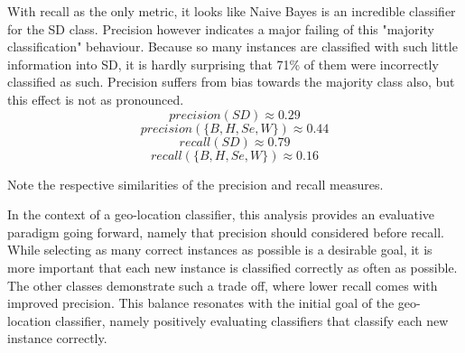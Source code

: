 \documentclass[twocolumn]{article}
\begin{document}
With recall as the only metric, it looks like Naive Bayes is an incredible classifier for the SD class. Precision however indicates a major failing of this "majority classification" behaviour. Because so many instances are classified with such little information into SD, it is hardly surprising that 71\% of them were incorrectly classified as such. Precision suffers from bias towards the majority class also, but this effect is not as pronounced.
\begin{equation}
precision(SD) \approx 0.29
\end{equation}
\begin{equation}
precision(\{B, H, Se, W\}) \approx 0.44
\end{equation}
\begin{equation}
recall(SD) \approx 0.79
\end{equation}
\begin{equation}
recall(\{B, H, Se, W\}) \approx 0.16
\end{equation}

Note the respective similarities of the precision and recall measures.

In the context of a geo-location classifier, this analysis provides an evaluative paradigm going forward, namely that precision should considered before recall. While selecting as many correct instances as possible is a desirable goal, it is more important that each new instance is classified correctly as often as possible. The other classes demonstrate such a trade off, where lower recall comes with improved precision. This balance resonates with the initial goal of the geo-location classifier, namely positively evaluating classifiers that classify each new instance correctly.
\end{document}
